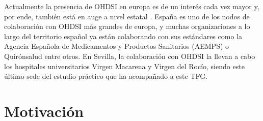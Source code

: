 Actualmente la presencia de OHDSI en europa es de un interés cada vez mayor y, por ende, también está en auge a nivel estatal \cite{ohdsiSpain}. España es uno de los nodos de colaboración con OHDSI más grandes de europa, y muchas organizaciones a lo largo del territorio español ya están colaborando con sus estándares como la Agencia Española de Medicamentos y Productos Sanitarios (AEMPS) o Quirónsalud entre otros. En Sevilla, la colaboración con OHDSI la llevan a cabo los hospitales universitarios Virgen Macarena y Virgen del Rocío, siendo este último sede del estudio práctico que ha acompañado a este TFG.



    


\section{Motivación}








    






